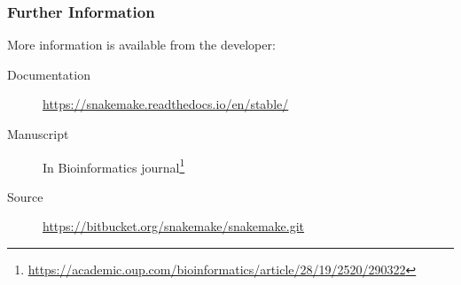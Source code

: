 \begin{frame}

\frametitle{Further Information}

More information is available from the developer:
\begin{description}
  \item[Documentation] \href{https://snakemake.readthedocs.io/en/stable/}{https://snakemake.readthedocs.io/en/stable/}
  \item[Manuscript] In Bioinformatics journal\footnote{\href{https://academic.oup.com/bioinformatics/article/28/19/2520/290322}{https://academic.oup.com/bioinformatics/article/28/19/2520/290322}}
  \item[Source] \href{https://bitbucket.org/snakemake/snakemake.git}{https://bitbucket.org/snakemake/snakemake.git}
\end{description}

\end{frame}


